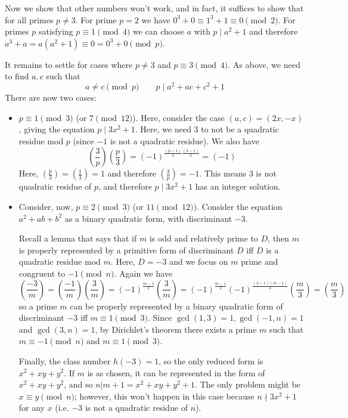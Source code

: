 \documentclass[11pt,a4paper]{article}
\begin{document}
\begin{enumerate}
	Now we show that other numbers won't work, and in fact, it suffices to show that for all primes $p\neq 3$. For prime $p=2$ we have $0^3+0\equiv 1^3+1\equiv 0\pmod{2}$. For primes $p$ satisfying $p\equiv 1\pmod{4}$ we can choose $a$ with $p\mid a^2+1$ and therefore $a^3+a=a(a^2+1)\equiv 0=0^3+0\pmod{p}$. 
	
	It remains to settle for cases where $p\neq 3$ and $p\equiv 3\pmod{4}$. As above, we need to find $a, c$ such that 
	\[
	a\neq c\pmod{p}\qquad p\mid a^2+ac+c^2+1
	\]
	There are now two cases: 
	\begin{itemize}
		\item $p\equiv 1\pmod{3}$ (or $7\pmod{12}$). Here, consider the case $(a, c)=(2x, -x)$, giving the equation $p\mid 3x^2+1$. Here, we need 3 to not be a quadratic residue mod $p$ (since $-1$ is not a quadratic residue). We also have 
		\[
		\left(\frac{3}{p}\right)\left(\frac{p}{3}\right) = (-1)^{\frac{(p-1)}{2}\frac{(3-1)}{2}}=(-1)
		\]
		Here, $\left(\frac{p}{3}\right)=\left(\frac{1}{3}\right)=1$ and therefore $\left(\frac{3}{p}\right)=-1$. This means 3 is not quadratic residue of $p$, and therefore $p\mid 3x^2+1$ has an integer solution. 
		
		\item Consider, now, $p\equiv 2\pmod{3}$ (or $11\pmod{12}$). Consider the equation $a^2+ab+b^2$ as a binary quadratic form, with discriminant $-3$. 
		
		Recall a lemma that says that if $m$ is odd and relatively prime to $D$, then $m$ is properly represented by a primitive form of discriminant $D$ iff $D$ is a quadratic residue mod $m$. 
		Here, $D=-3$ and we focus on $m$ prime and congruent to $-1\pmod{n}$. Again we have 
		\[\left(\frac{-3}{m}\right)=\left(\frac{-1}{m}\right)\left(\frac{3}{m}\right)=(-1)^{\frac{m-1}{2}}\left(\frac{3}{m}\right)=(-1)^{\frac{m-1}{2}}(-1)^{\frac{(3-1)(m-1)}{4}}\left(\frac{m}{3}\right)=\left(\frac{m}{3}\right)\]
		so a prime $m$ can be properly represented by a binary quadratic form of discriminant $-3$ iff $m\equiv 1\pmod{3}$. Since $\gcd(1, 3)=1, \gcd(-1, n)=1$ and $\gcd(3, n)=1$, by Dirichlet's theorem there exists a prime $m$ such that $m\equiv -1\pmod{n}$ and $m\equiv 1\pmod{3}$. 
		
		Finally, the class number $h(-3)=1$, so the only reduced form is $x^2+xy+y^2$. If $m$ is as chosen, it can be represented in the form of $x^2+xy+y^2$, and so $n|m+1=x^2+xy+y^2+1$. 
		The only problem might be $x\equiv y\pmod{n}$; however, this won't happen in this case because $n\nmid 3x^2+1$ for any $x$ (i.e. $-3$ is not a quadratic residue of $n$). 
	\end{itemize}
	

\end{enumerate}
\end{document}
